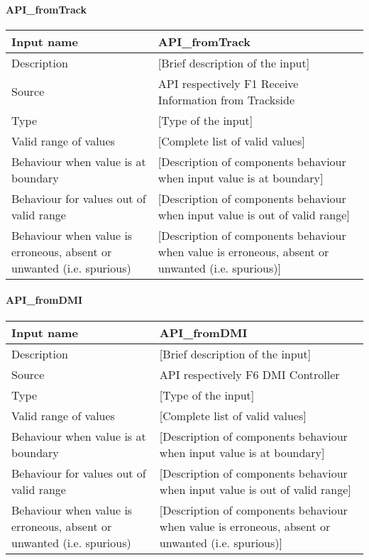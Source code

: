 \paragraph{API\_fromTrack}

\begin{longtable}{p{}p{}}
\toprule
Input name				& API\_fromTrack \\
\midrule
Description				& [Brief description of the input] \\
\midrule
Source					& API respectively F1 Receive Information from Trackside\\ 
\midrule
Type					& [Type of the input] \\
\midrule
Valid range of values	& [Complete list of valid values] \\
\midrule
Behaviour when value is at boundary	& [Description of components behaviour when input value is at boundary] \\
\midrule
Behaviour for values out of valid range	& [Description of components behaviour when input value is out of valid range] \\
\midrule
Behaviour when value is erroneous, absent or unwanted (i.e. spurious) & [Description of components behaviour when value is erroneous, absent or unwanted (i.e. spurious)] \\
\bottomrule
\end{longtable}

\paragraph{API\_fromDMI}

\begin{longtable}{p{}p{}}
\toprule
Input name				& API\_fromDMI \\
\midrule
Description				& [Brief description of the input] \\
\midrule
Source					& API respectively F6 DMI Controller\\ 
\midrule
Type					& [Type of the input] \\
\midrule
Valid range of values	& [Complete list of valid values] \\
\midrule
Behaviour when value is at boundary	& [Description of components behaviour when input value is at boundary] \\
\midrule
Behaviour for values out of valid range	& [Description of components behaviour when input value is out of valid range] \\
\midrule
Behaviour when value is erroneous, absent or unwanted (i.e. spurious) & [Description of components behaviour when value is erroneous, absent or unwanted (i.e. spurious)] \\
\bottomrule
\end{longtable}

